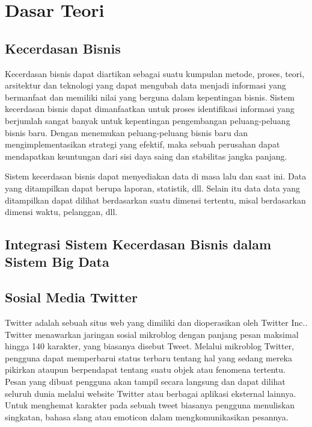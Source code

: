 \chapter{Dasar Teori}
\label{chap:dasar_teori}
	
\section{Kecerdasan Bisnis}
\label{sec:kecerdasan_bisnis}
Kecerdasan bisnis dapat diartikan sebagai suatu kumpulan metode, proses, teori, arsitektur dan teknologi yang dapat mengubah data menjadi informasi yang bermanfaat dan memiliki nilai yang berguna dalam kepentingan bisnis. Sistem kecerdasan bisnis dapat dimanfaatkan untuk proses identifikasi informasi yang berjumlah sangat banyak untuk kepentingan pengembangan peluang-peluang bisnis baru. Dengan menemukan peluang-peluang bisnis baru dan mengimplementasikan strategi yang efektif, maka sebuah perusahan dapat mendapatkan keuntungan dari sisi daya saing dan stabilitas jangka panjang.

Sistem kecerdasan bisnis dapat menyediakan data di masa lalu dan saat ini. Data yang ditampilkan dapat berupa laporan, statistik, dll. Selain itu data data yang ditampilkan dapat dilihat berdasarkan suatu dimensi tertentu, misal berdasarkan dimensi waktu, pelanggan, dll.


\section{Integrasi Sistem Kecerdasan Bisnis dalam Sistem Big Data}
\label{sec:integrasi_kecerdasan_bisnis}

\section{Sosial Media Twitter}
\label{sec:twitter}
Twitter adalah sebuah situs web yang dimiliki dan dioperasikan oleh Twitter Inc.. Twitter menawarkan jaringan sosial mikroblog dengan panjang pesan maksimal hingga 140 karakter, yang biasanya disebut Tweet. Melalui mikroblog Twitter, pengguna dapat memperbarui status terbaru tentang hal yang sedang mereka pikirkan ataupun berpendapat tentang suatu objek atau fenomena tertentu. Pesan yang dibuat pengguna akan tampil secara langsung dan dapat dilihat seluruh dunia melalui website Twitter atau berbagai aplikasi eksternal lainnya. Untuk menghemat karakter pada sebuah tweet biasanya pengguna menuliskan singkatan, bahasa slang atau emoticon dalam mengkomunikasikan pesannya. 

